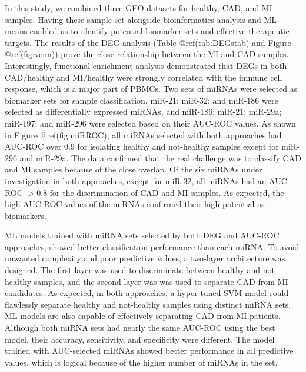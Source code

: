 \documentclass[
]{article}
\begin{document}
In this study, we combined three GEO datasets for healthy, CAD, and MI
samples. Having these sample set alongside bioinformatics analysis and
ML means enabled us to identify potential biomarker sets and effective
therapeutic targets. The results of the DEG analysis (Table
@ref(tab:DEGstab) and Figure @ref(fig:venn)) prove the close
relationship between the MI and CAD samples. Interestingly, functional
enrichment analysis demonstrated that DEGs in both CAD/healthy and
MI/healthy were strongly correlated with the immune cell response, which
is a major part of PBMCs. Two sets of miRNAs were selected as biomarker
sets for sample classification. miR-21; miR-32; and miR-186 were
selected as differentially expressed miRNAs, and miR-186; miR-21;
miR-29a; miR-197; and miR-296 were selected based on their AUC-ROC
values. As shown in Figure @ref(fig:miRROC), all miRNAs selected with
both approaches had AUC-ROC over 0.9 for isolating healthy and
not-healthy samples except for miR-296 and miR-29a. The data confirmed
that the real challenge was to classify CAD and MI samples because of
the close overlap. Of the six miRNAs under investigation in both
approaches, except for miR-32, all miRNAs had an AUC-ROC \(> 0.8\) for
the discrimination of CAD and MI samples. As expected, the high AUC-ROC
values of the miRNAs confirmed their high potential as biomarkers.

ML models trained with miRNA sets selected by both DEG and AUC-ROC
approaches, showed better classification performance than each miRNA. To
avoid unwanted complexity and poor predictive values, a two-layer
architecture was designed. The first layer was used to discriminate
between healthy and not-healthy samples, and the second layer was was
used to separate CAD from MI candidates. As expected, in both
approaches, a hyper-tuned SVM model could flawlessly separate healthy
and not-healthy samples using distinct miRNA sets. ML models are also
capable of effectively separating CAD from MI patients. Although both
miRNA sets had nearly the same AUC-ROC using the best model, their
accuracy, sensitivity, and specificity were different. The model trained
with AUC-selected miRNAs showed better performance in all predictive
values, which is logical because of the higher number of miRNAs in the
set.
\end{document}

